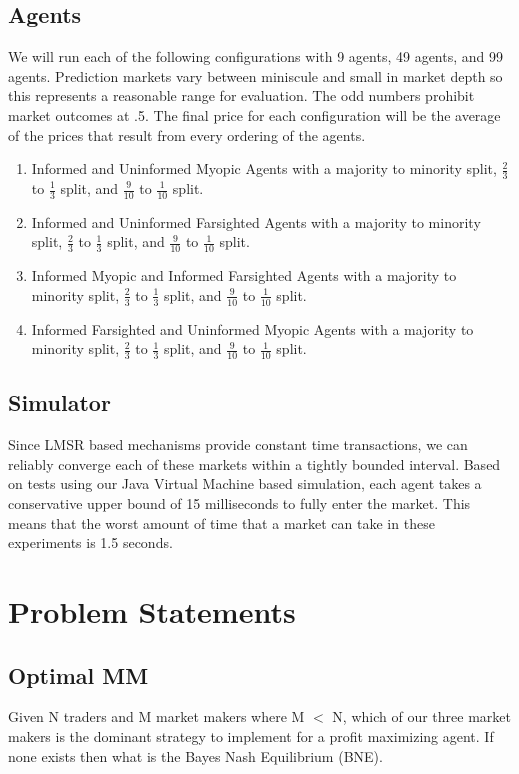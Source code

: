 \subsection{Agents}
We will run each of the following configurations with 9 agents, 49 agents, and 99 agents. Prediction markets vary between miniscule and small in market depth so this represents a reasonable range for evaluation. The odd numbers prohibit market outcomes at .5. The final price for each configuration will be the average of the prices that result from every ordering of the agents.
\begin{enumerate}
\item Informed and Uninformed Myopic Agents with a majority to minority split, $\frac{2}{3}$ to $\frac{1}{3}$ split, and $\frac{9}{10}$ to $\frac{1}{10}$ split.
\item Informed and Uninformed Farsighted Agents with a majority to minority split, $\frac{2}{3}$ to $\frac{1}{3}$ split, and $\frac{9}{10}$ to $\frac{1}{10}$ split.
\item Informed Myopic and Informed Farsighted Agents with a majority to minority split, $\frac{2}{3}$ to $\frac{1}{3}$ split, and $\frac{9}{10}$ to $\frac{1}{10}$ split.
\item Informed Farsighted and Uninformed Myopic Agents with a majority to minority split, $\frac{2}{3}$ to $\frac{1}{3}$ split, and $\frac{9}{10}$ to $\frac{1}{10}$ split.
\end{enumerate}

\subsection{Simulator}
Since LMSR based mechanisms provide constant time transactions, we can reliably converge each of these markets within a tightly bounded interval. Based on tests using our Java Virtual Machine based simulation, each agent takes a conservative upper bound of 15 milliseconds to fully enter the market. This means that the worst amount of time that a market can take in these experiments is 1.5 seconds.

\iffalse
\section{Problem Statements}
\subsection{Optimal MM}
Given N traders and M market makers where M $<$ N, which of our three market makers is the
dominant strategy to implement for a profit maximizing agent. 
If none exists then what is the Bayes Nash Equilibrium (BNE).\\

